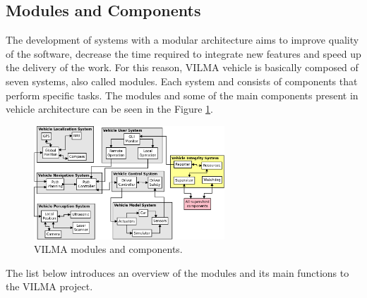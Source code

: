 \documentclass[conference]{IEEEtran}
\begin{document}


%
\subsection{Modules and Components}\label{subsec:modules_components}

The development of systems with a modular architecture aims to improve quality of the software, decrease the time required to integrate new features and speed up the delivery of the work. For this reason, VILMA vehicle is basically composed of seven systems, also called modules. Each system and consists of components that perform specific tasks. The modules and some of the main components present in vehicle architecture can be seen in the Figure \ref{fig:VILMA_MODULES_COMPONENTS}.

\begin{figure}[h]
	\centering
	\includegraphics[width=270px,keepaspectratio]{imagens/VILMA_MODULES_COMPONENTS}
	\caption{VILMA modules and components.}
	\label{fig:VILMA_MODULES_COMPONENTS}
\end{figure}

The list below introduces an overview of the modules and its main functions to the VILMA project.
\end{document}
